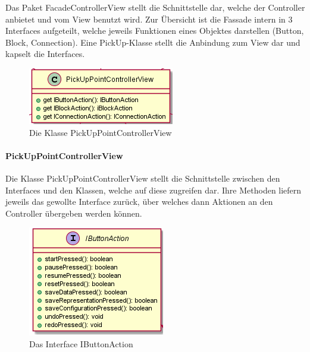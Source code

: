 \documentclass[parskip=full]{scrartcl}
\begin{document}
Das Paket FacadeControllerView stellt die Schnittstelle dar, welche der Controller anbietet und vom View benutzt wird. Zur Übersicht ist die Fassade intern in 3 Interfaces aufgeteilt, welche jeweils Funktionen eines Objektes darstellen (Button, Block, Connection). Eine PickUp-Klasse stellt die Anbindung zum View dar und kapselt die Interfaces.

\begin{figure}[htbp]
	\begin{center}
		\includegraphics[width = 8 cm]{Grafiken/View/PickUpPoint.png}
		\caption{Die Klasse PickUpPointControllerView}
		\label{PickUpPointControllerView}
	\end{center}
\end{figure}

\paragraph{PickUpPointControllerView}

Die Klasse PickUpPointControllerView stellt die Schnittstelle zwischen den Interfaces und den Klassen, welche auf diese zugreifen dar. Ihre Methoden liefern jeweils das gewollte Interface zurück, über welches dann Aktionen an den Controller übergeben werden können.

\clearpage

\begin{figure}[htbp]
	\begin{center}
		\includegraphics[width = 7 cm]{Grafiken/View/IButtonAction.png}
		\caption{Das Interface IButtonAction}
		\label{Entwurf_Grob}
	\end{center}
\end{figure}
\end{document}
